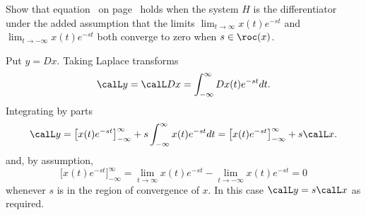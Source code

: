\begin{excersizelist}
\item \label{exer:laplacetransdiffproperty} Show that equation~ on page~ holds when the system $H$ is the differentiator under the added assumption that the limits $\lim_{t\to\infty} x(t) e^{-st}$ and $\lim_{t\to-\infty} x(t) e^{-st}$ both converge to zero when $s \in \roc(x)$. 
\begin{solution}

Put $y = Dx$.  Taking Laplace transforms
\[
\calL y = \calL D x = \int_{-\infty}^{\infty} Dx(t) e^{-st} dt.
\]
Integrating by parts 
\[
\calL y = \big[ x(t) e^{-st} \big]_{-\infty}^\infty + s\int_{-\infty}^{\infty} x(t) e^{-st} dt = \big[ x(t) e^{-st} \big]_{-\infty}^\infty + s\calL x.
\]
and, by assumption, 
\[
\big[ x(t) e^{-st} \big]_{-\infty}^\infty = \lim_{t\to\infty} x(t) e^{-st}  - \lim_{t\to-\infty} x(t) e^{-st} = 0
\] 
whenever $s$ is in the region of convergence of $x$.  In this case $\calL y = s\calL x$ as required.


\end{solution}
\end{excersizelist}
